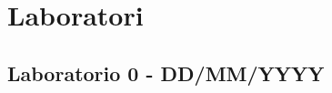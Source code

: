 \documentclass[../main.tex]{subfiles}
\begin{document}
\clearpage
\thispagestyle{empty}
\vspace*{7cm}
\section{Laboratori}
\vspace*{1.5cm}





\vspace*{1.5cm}
\subsection{Laboratorio 0 - DD/MM/YYYY}
\vspace*{1.5cm}





	
\end{document}
